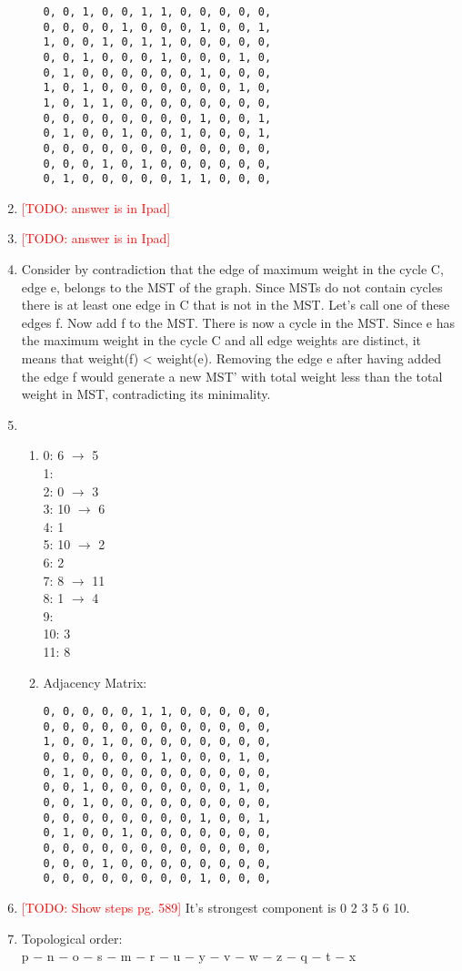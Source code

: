 \documentclass[11pt,fleqn]{article}
\newcommand\todo[1]{\textcolor{red}{[TODO: #1]}}
\begin{document}
\begin{enumerate}
\begin{enumerate}
\begin{verbatim}
0, 0, 1, 0, 0, 1, 1, 0, 0, 0, 0, 0, 
0, 0, 0, 0, 1, 0, 0, 0, 1, 0, 0, 1, 
1, 0, 0, 1, 0, 1, 1, 0, 0, 0, 0, 0, 
0, 0, 1, 0, 0, 0, 1, 0, 0, 0, 1, 0, 
0, 1, 0, 0, 0, 0, 0, 0, 1, 0, 0, 0, 
1, 0, 1, 0, 0, 0, 0, 0, 0, 0, 1, 0, 
1, 0, 1, 1, 0, 0, 0, 0, 0, 0, 0, 0, 
0, 0, 0, 0, 0, 0, 0, 0, 1, 0, 0, 1, 
0, 1, 0, 0, 1, 0, 0, 1, 0, 0, 0, 1, 
0, 0, 0, 0, 0, 0, 0, 0, 0, 0, 0, 0, 
0, 0, 0, 1, 0, 1, 0, 0, 0, 0, 0, 0, 
0, 1, 0, 0, 0, 0, 0, 1, 1, 0, 0, 0, 
\end{verbatim}
		\end{enumerate}
	\item \todo{answer is in Ipad}
	\item \todo{answer is in Ipad}
	\item Consider by contradiction that the edge of maximum weight in the cycle C, edge e, belongs to the MST of the graph.
Since MSTs do not contain cycles there is at least one edge in C that is not in the MST. Let's call one of these edges f.
Now add f to the MST. There is now a cycle in the MST. Since e has the maximum weight in the cycle C and all edge weights are distinct, it means that weight(f) < weight(e). 
Removing the edge e after having added the edge f would generate a new MST' with total weight less than the total weight in MST, contradicting its minimality.
	\item 
		\begin{enumerate}
			\item
0: 6 $\rightarrow$ 5 \\
1: \\
2: 0 $\rightarrow$ 3 \\
3: 10 $\rightarrow$ 6 \\
4: 1 \\
5: 10 $\rightarrow$ 2 \\
6: 2 \\
7: 8 $\rightarrow$ 11 \\
8: 1 $\rightarrow$ 4 \\
9: \\
10: 3 \\
11: 8
			\item Adjacency Matrix:
\begin{verbatim}
0, 0, 0, 0, 0, 1, 1, 0, 0, 0, 0, 0, 
0, 0, 0, 0, 0, 0, 0, 0, 0, 0, 0, 0, 
1, 0, 0, 1, 0, 0, 0, 0, 0, 0, 0, 0, 
0, 0, 0, 0, 0, 0, 1, 0, 0, 0, 1, 0, 
0, 1, 0, 0, 0, 0, 0, 0, 0, 0, 0, 0, 
0, 0, 1, 0, 0, 0, 0, 0, 0, 0, 1, 0, 
0, 0, 1, 0, 0, 0, 0, 0, 0, 0, 0, 0, 
0, 0, 0, 0, 0, 0, 0, 0, 1, 0, 0, 1, 
0, 1, 0, 0, 1, 0, 0, 0, 0, 0, 0, 0, 
0, 0, 0, 0, 0, 0, 0, 0, 0, 0, 0, 0, 
0, 0, 0, 1, 0, 0, 0, 0, 0, 0, 0, 0, 
0, 0, 0, 0, 0, 0, 0, 0, 1, 0, 0, 0, 
\end{verbatim}
		\end{enumerate}
	\item \todo{Show steps pg. 589}
It's strongest component is 0 2 3 5 6 10.
	\item Topological order: \\
p $-$ n $-$ o $-$ s $-$ m $-$ r $-$ u $-$ y $-$ v $-$ w $-$ z $-$ q $-$ t $-$ x 

\end{enumerate}
\end{document}

